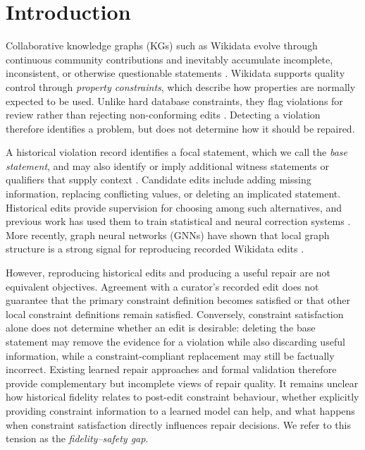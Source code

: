 \documentclass[a4paper,UKenglish,cleveref,autoref,thm-restate]{tgdk-v2021}
\begin{document}
\section{Introduction}
\label{sec:introduction}

Collaborative knowledge graphs (KGs) such as Wikidata evolve through continuous community contributions and inevitably accumulate incomplete, inconsistent, or otherwise questionable statements \cite{hogan2021knowledge,vrandecic2014wikidata,polleres2023evolution,shenoy2022quality}. Wikidata supports quality control through \emph{property constraints}, which describe how properties are normally expected to be used. Unlike hard database constraints, they flag violations for review rather than rejecting non-conforming edits \cite{ferranti2024formalizing,wikidataPropertyConstraintsPortal,wikibaseQualityConstraints}. Detecting a violation therefore identifies a problem, but does not determine how it should be repaired.

A historical violation record identifies a focal statement, which we call the \emph{base statement}, and may also identify or imply additional witness statements or qualifiers that supply context \cite{bertossi2022database,ahmetaj2022repairing,ahmetaj2025logic,ferranti2025repairs}. Candidate edits include adding missing information, replacing conflicting values, or deleting an implicated statement. Historical edits provide supervision for choosing among such alternatives, and previous work has used them to train statistical and neural correction systems \cite{pellissier2019learning,pellissier2021neural}. More recently, graph neural networks (GNNs) have shown that local graph structure is a strong signal for reproducing recorded Wikidata edits \cite{vazquez2026structure}.

However, reproducing historical edits and producing a useful repair are not equivalent objectives. Agreement with a curator's recorded edit does not guarantee that the primary constraint definition becomes satisfied or that other local constraint definitions remain satisfied. Conversely, constraint satisfaction alone does not determine whether an edit is desirable: deleting the base statement may remove the evidence for a violation while also discarding useful information, while a constraint-compliant replacement may still be factually incorrect. Existing learned repair approaches and formal validation therefore provide complementary but incomplete views of repair quality. It remains unclear how historical fidelity relates to post-edit constraint behaviour, whether explicitly providing constraint information to a learned model can help, and what happens when constraint satisfaction directly influences repair decisions. We refer to this tension as the \emph{fidelity--safety gap}. %
\end{document}
